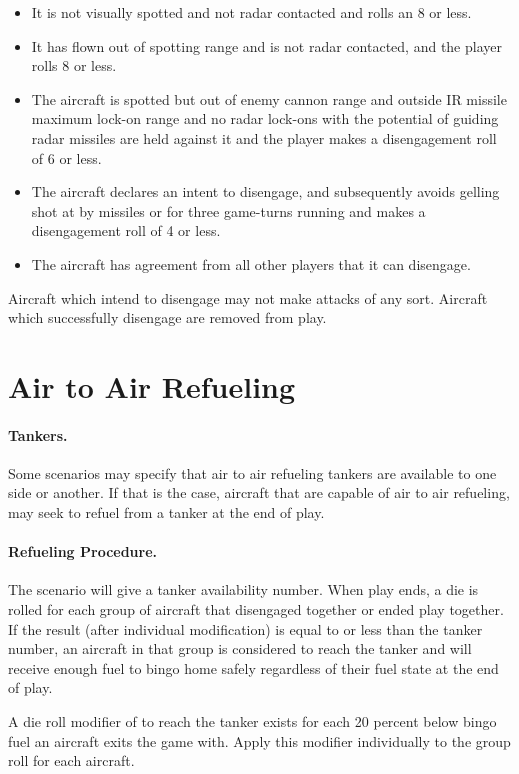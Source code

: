 \begin{itemize}

    \item It is not visually spotted and not radar contacted and rolls an 8 or less.

    \item It has flown out of spotting range and is not radar contacted, and the player rolls 8 or less.

    \item The aircraft is spotted but out of enemy cannon range and outside IR missile maximum lock-on range and no radar lock-ons with the potential of guiding radar missiles are held against it and the player makes a disengagement roll of 6 or less.

    \item The aircraft declares an intent to disengage, and subsequently avoids gelling shot at by missiles or for three game-turns running and makes a disengagement roll of 4 or less.

    \item The aircraft has agreement from all other players that it can disengage.

\end{itemize}

Aircraft which intend to disengage may not make attacks of any sort. Aircraft which successfully disengage are removed from play.

\section{Air to Air Refueling}
\label{rule:air-to-air-refueling}

\paragraph{Tankers.} Some scenarios may specify that air to air refueling tankers are available to one side or another. If that is the case, aircraft that are capable of air to air refueling, may seek to refuel from a tanker at the end of play.

\paragraph{Refueling Procedure.} The scenario will give a tanker availability number. When play ends, a die is rolled for each group of aircraft that disengaged together or ended play together. If the result (after individual modification) is equal to or less than the tanker number, an aircraft in that group is considered to reach the tanker and will receive enough fuel to bingo home safely regardless of their fuel state at the end of play.

A die roll modifier of  to reach the tanker exists for each 20 percent below bingo fuel an aircraft exits the game with. Apply this modifier individually to the group roll for each aircraft.
